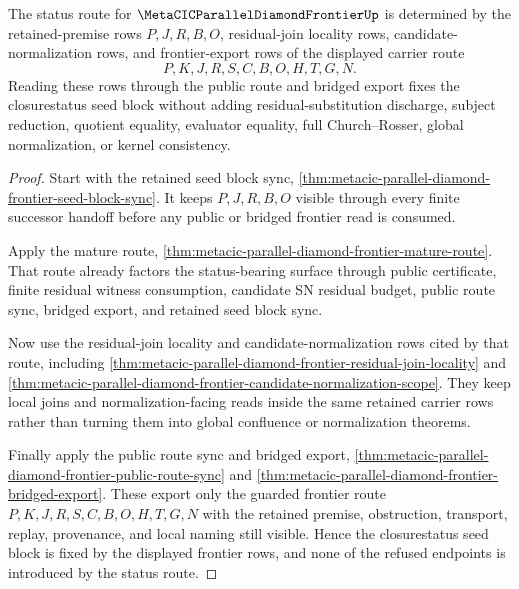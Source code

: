 \begin{theorem}
\label{thm:metacic-parallel-diamond-frontier-closurestatus-seed-block}
The status route for $\MetaCICParallelDiamondFrontierUp$ is determined by the retained-premise rows $P,J,R,B,O$, residual-join locality rows, candidate-normalization rows, and frontier-export rows of the displayed carrier route
$$
P,K,J,R,S,C,B,O,H,T,G,N.
$$
Reading these rows through the public route and bridged export fixes the closurestatus seed block without adding residual-substitution discharge, subject reduction, quotient equality, evaluator equality, full Church--Rosser, global normalization, or kernel consistency.
\end{theorem}
\begin{proof}
Start with the retained seed block sync, \autoref{thm:metacic-parallel-diamond-frontier-seed-block-sync}. It keeps $P,J,R,B,O$ visible through every finite successor handoff before any public or bridged frontier read is consumed.

Apply the mature route, \autoref{thm:metacic-parallel-diamond-frontier-mature-route}. That route already factors the status-bearing surface through public certificate, finite residual witness consumption, candidate SN residual budget, public route sync, bridged export, and retained seed block sync.

Now use the residual-join locality and candidate-normalization rows cited by that route, including \autoref{thm:metacic-parallel-diamond-frontier-residual-join-locality} and \autoref{thm:metacic-parallel-diamond-frontier-candidate-normalization-scope}. They keep local joins and normalization-facing reads inside the same retained carrier rows rather than turning them into global confluence or normalization theorems.

Finally apply the public route sync and bridged export, \autoref{thm:metacic-parallel-diamond-frontier-public-route-sync} and \autoref{thm:metacic-parallel-diamond-frontier-bridged-export}. These export only the guarded frontier route $P,K,J,R,S,C,B,O,H,T,G,N$ with the retained premise, obstruction, transport, replay, provenance, and local naming still visible. Hence the closurestatus seed block is fixed by the displayed frontier rows, and none of the refused endpoints is introduced by the status route.
\end{proof}
